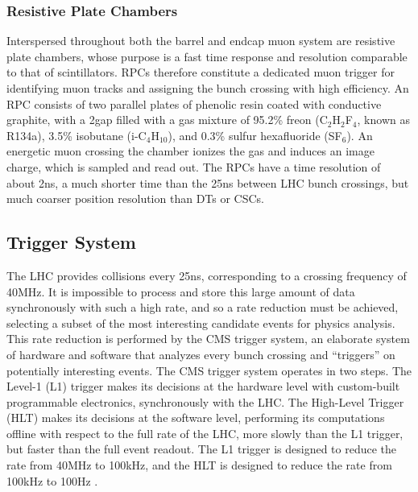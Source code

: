 \subsubsection{Resistive Plate Chambers}
Interspersed throughout both the barrel and endcap muon system are resistive plate chambers, whose purpose is a fast time response and resolution comparable to that of scintillators.
RPCs therefore constitute a dedicated muon trigger for identifying muon tracks and assigning the bunch crossing with high efficiency.
An RPC consists of two parallel plates of phenolic resin coated with conductive graphite, with a 2\mm gap filled with a gas mixture of 95.2\% freon (C$_2$H$_2$F$_4$, known as R134a), 3.5\% isobutane (i-C$_4$H$_{10}$), and 0.3\% sulfur hexafluoride (SF$_6$).
An energetic muon crossing the chamber ionizes the gas and induces an image charge, which is sampled and read out.
The RPCs have a time resolution of about 2\unit{ns}, a much shorter time than the 25\unit{ns} between LHC bunch crossings, but much coarser position resolution than DTs or CSCs.

\subsection{Trigger System}
The LHC provides \pp collisions every 25\unit{ns}, corresponding to a crossing frequency of 40\unit{MHz}.
It is impossible to process and store this large amount of data synchronously with such a high rate, and so a rate reduction must be achieved, selecting a subset of the most interesting candidate events for physics analysis.
This rate reduction is performed by the CMS trigger system, an elaborate system of hardware and software that analyzes every bunch crossing and ``triggers'' on potentially interesting events.
The CMS trigger system operates in two steps.
The Level-1 (L1) trigger makes its decisions at the hardware level with custom-built programmable electronics, synchronously with the LHC.
The High-Level Trigger (HLT) makes its decisions at the software level, performing its computations offline with respect to the full rate of the LHC, more slowly than the L1 trigger, but faster than the full event readout.
The L1 trigger is designed to reduce the rate from 40\unit{MHz} to 100\unit{kHz}, and the HLT is designed to reduce the rate from 100\unit{kHz} to 100\unit{Hz} \cite{Chatrchyan:2008zzk, Adam:2005zf}.

